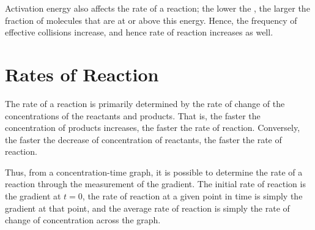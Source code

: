 			Activation energy also affects the rate of a reaction; the lower the \ea{}, the larger the fraction of molecules that are at or above
			this energy. Hence, the frequency of effective collisions increase, and hence rate of reaction increases as well.



	\section{Rates of Reaction}

		The rate of a reaction is primarily determined by the rate of change of the concentrations of the reactants and products. That is,
		the faster the concentration of products increases, the faster the rate of reaction. Conversely, the faster the decrease of
		concentration of reactants, the faster the rate of reaction.

		\begin{center}
		\end{center}

		Thus, from a concentration-time graph, it is possible to determine the rate of a reaction through the measurement of the gradient.
		The initial rate of reaction is the gradient at $t = 0$, the rate of reaction at a given point in time is simply the gradient at that
		point, and the average rate of reaction is simply the rate of change of concentration across the graph.


